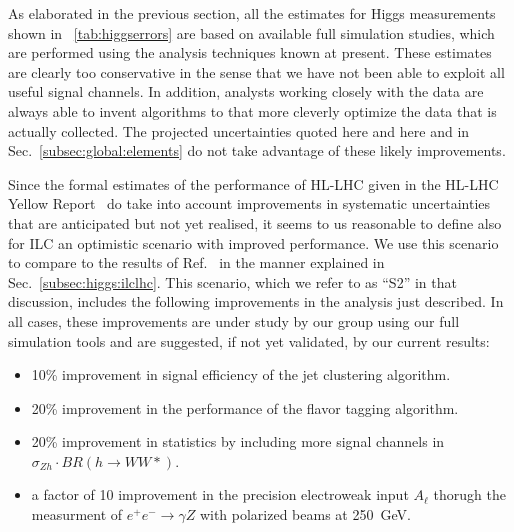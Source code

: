 







As elaborated in the previous section, all the estimates for Higgs measurements shown in
~\ref{tab:higgserrors} are based on available full simulation studies, which are performed using the analysis
techniques known at present. These estimates are clearly too
conservative in the sense that we have not been able to exploit all
useful signal channels.  In addition, analysts working closely with
the data are always able to invent algorithms to that more cleverly
optimize the data that is actually collected.   The projected
uncertainties  quoted here and
here and in Sec.~\ref{subsec:global:elements} do not take advantage of
these  likely improvements.

Since the formal estimates of the performance of HL-LHC given in the
HL-LHC Yellow Report~\cite{Cepeda:2019klc} do take into account
improvements in systematic uncertainties that are anticipated but not
yet realised, it seems to us reasonable to define also for ILC an
optimistic scenario with improved performance.   We use this scenario
to compare to the results of Ref.~\cite{Cepeda:2019klc} in the manner
explained in Sec.~\ref{subsec:higgs:ilclhc}.   This scenario, which we 
refer to as ``S2'' in that discussion, includes the following
improvements in the analysis just described.  In all cases, these
improvements are under study by our group using our full simulation
tools
and are  suggested, if not yet validated, by our current results: 
\begin{itemize}
\item 10\% improvement in signal efficiency of the  jet clustering algorithm.
\item 20\% improvement in the performance of the  flavor tagging algorithm. 
\item 20\% improvement in statistics by including more signal channels
  in  $\sigma_{Zh}\cdot BR(h\to WW*)$. 
\item a factor of 10 improvement in the precision electroweak input
  $A_{\ell}$ thorugh the measurment of $e^+e^-\to\gamma Z$ with
  polarized beams at 250~GeV.
\end{itemize}